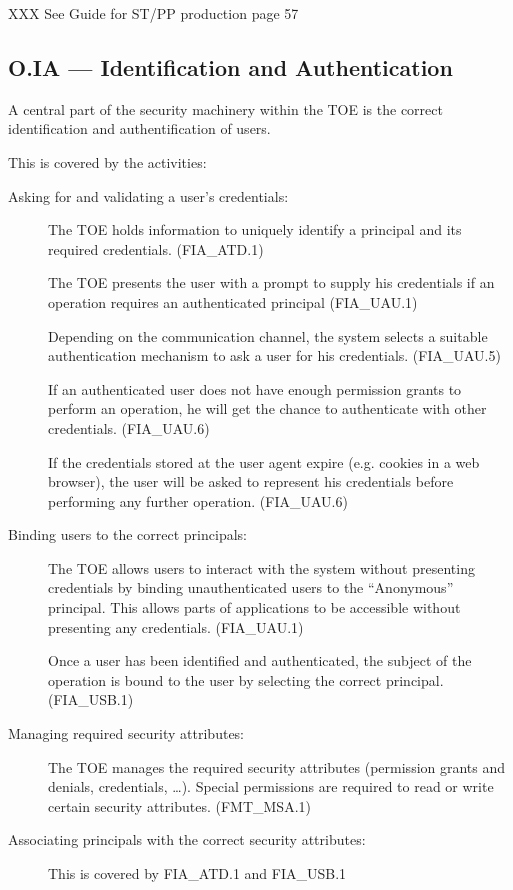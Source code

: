 \documentclass[12pt,english]{scrbook}
\begin{document}
XXX See Guide for ST/PP production page 57

\subsection{O.IA --- Identification and Authentication}

    A central part of the security machinery within the TOE is the correct
    identification and authentification of users.

    This is covered by the activities:

    \begin{description}
        \item[Asking for and validating a user's credentials:]

            The TOE holds information to uniquely identify a principal and its
            required credentials. (FIA\_ATD.1) 
            
            The TOE presents the user with a prompt to supply his credentials
            if an operation requires an authenticated principal (FIA\_UAU.1)

            Depending on the communication channel, the system selects a
            suitable authentication mechanism to ask a user for his
            credentials. (FIA\_UAU.5)

            If an authenticated user does not have enough permission grants to
            perform an operation, he will get the chance to authenticate with
            other credentials. (FIA\_UAU.6)

            If the credentials stored at the user agent expire (e.g. cookies in
            a web browser), the user will be asked to represent his credentials
            before performing any further operation. (FIA\_UAU.6)

        \item[Binding users to the correct principals:]

            The TOE allows users to interact with the system without presenting
            credentials by binding unauthenticated users to the ``Anonymous''
            principal. This allows parts of applications to be accessible without
            presenting any credentials. (FIA\_UAU.1)

            Once a user has been identified and authenticated, the subject of
            the operation is bound to the user by selecting the correct
            principal. (FIA\_USB.1)

        \item[Managing required security attributes:]

            The TOE manages the required security attributes (permission grants
            and denials, credentials, \dots). Special permissions are required
            to read or write certain security attributes. (FMT\_MSA.1)

        \item[Associating principals with the correct security attributes:]

            This is covered by FIA\_ATD.1 and FIA\_USB.1

    \end{description}
\end{document}
